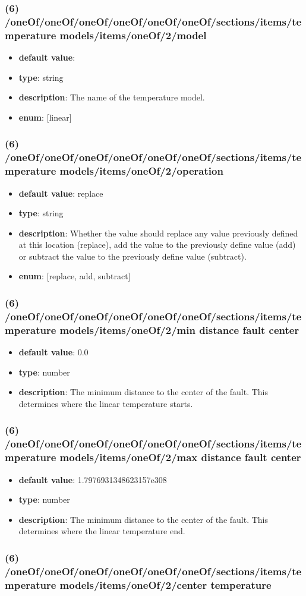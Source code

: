 \subsubsection{(6) /oneOf/oneOf/oneOf/oneOf/oneOf/oneOf/sections/items/temperature models/items/oneOf/2/model}
\begin{itemize}[leftmargin=6em]\item {\bf default value}: 
\item {\bf type}: string
\item {\bf description}: The name of the temperature model.
\item {\bf enum}: [linear]\end{itemize}\subsubsection{(6) /oneOf/oneOf/oneOf/oneOf/oneOf/oneOf/sections/items/temperature models/items/oneOf/2/operation}
\begin{itemize}[leftmargin=6em]\item {\bf default value}: replace
\item {\bf type}: string
\item {\bf description}: Whether the value should replace any value previously defined at this location (replace), add the value to the previously define value (add) or subtract the value to the previously define value (subtract).
\item {\bf enum}: [replace, add, subtract]\end{itemize}\subsubsection{(6) /oneOf/oneOf/oneOf/oneOf/oneOf/oneOf/sections/items/temperature models/items/oneOf/2/min distance fault center}
\begin{itemize}[leftmargin=6em]\item {\bf default value}: 0.0
\item {\bf type}: number
\item {\bf description}: The minimum distance to the center of the fault. This determines where the linear temperature starts.
\end{itemize}\subsubsection{(6) /oneOf/oneOf/oneOf/oneOf/oneOf/oneOf/sections/items/temperature models/items/oneOf/2/max distance fault center}
\begin{itemize}[leftmargin=6em]\item {\bf default value}: 1.7976931348623157e308
\item {\bf type}: number
\item {\bf description}: The minimum distance to the center of the fault. This determines where the linear temperature end.
\end{itemize}\subsubsection{(6) /oneOf/oneOf/oneOf/oneOf/oneOf/oneOf/sections/items/temperature models/items/oneOf/2/center temperature}

